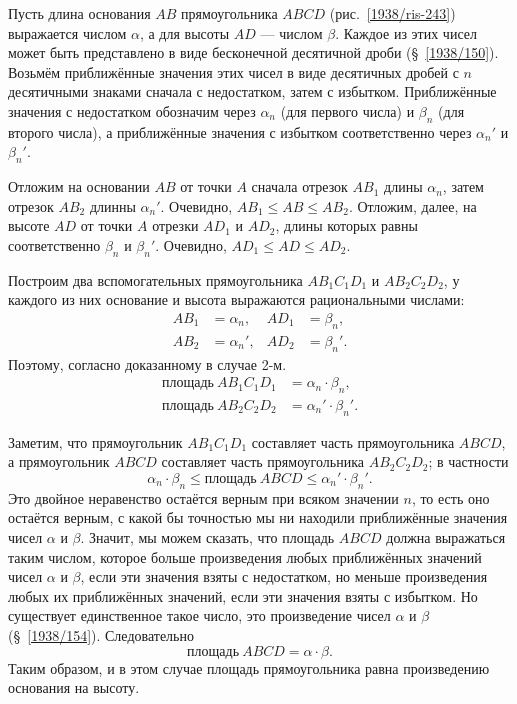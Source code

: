 \documentclass[twoside]{book}
\begin{document}
Пусть длина основания $AB$ прямоугольника $ABCD$ (рис.~\ref{1938/ris-243}) выражается  числом $\alpha$, а для высоты $AD$ — числом $\beta$.
Каждое из этих чисел может быть представлено в виде бесконечной десятичной дроби (§~\ref{1938/150}).
Возьмём приближённые значения этих чисел в виде десятичных дробей с $n$ десятичными знаками сначала с недостатком, затем с избытком.
Приближённые значения с недостатком обозначим через $\alpha_n$ (для первого числа) и $\beta_n$ (для второго числа), а приближённые значения с избытком соответственно через  $\alpha_n'$ и $\beta_n'$.

Отложим на основании $AB$ от точки $A$ сначала отрезок $AB_1$ длины $\alpha_n$, затем отрезок $AB_2$ длинны  $\alpha_n'$.
Очевидно, $AB_1\le AB\le AB_2$.
Отложим, далее, на высоте $AD$ от точки $A$ отрезки $AD_1$ и $AD_2$, длины которых равны соответственно $\beta_n$ и $\beta_n'$.
Очевидно, $AD_1\le AD\le AD_2$.

{\sloppy

Построим два вспомогательных прямоугольника $AB_1C_1D_1$ и $AB_2C_2D_2$, у каждого из них основание и высота выражаются рациональными числами:
\begin{align*}
AB_1&=\alpha_n,
&
AD_1&=\beta_n,
\\
AB_2&=\alpha_n',
&
AD_2&=\beta_n'.
\end{align*}
Поэтому, согласно доказанному в случае 2-м.
\begin{align*}
\text{площадь}~AB_1C_1D_1 &= \alpha_n\cdot \beta_n, 
\\
\text{площадь}~AB_2C_2D_2 &= \alpha_n'\cdot \beta_n'. 
\end{align*}

}

Заметим, что прямоугольник $AB_1C_1D_1$ составляет часть прямоугольника $ABCD$, 
а прямоугольник $ABCD$ составляет часть прямоугольника $AB_2C_2D_2$;
в частности
\[\alpha_n\cdot \beta_n\le\text{площадь}~ABCD\le\alpha_n'\cdot \beta_n'.\]
Это двойное неравенство остаётся верным при всяком значении $n$, то есть оно остаётся верным, с какой бы точностью мы ни находили приближённые значения чисел $\alpha$ и $\beta$.
Значит, мы можем сказать, что площадь $ABCD$ должна выражаться таким числом, которое больше произведения любых приближённых значений чисел $\alpha$ и $\beta$, если эти значения взяты с недостатком, но меньше произведения любых их приближённых значений, если эти значения взяты с избытком.
Но существует единственное такое число, это произведение чисел $\alpha$ и $\beta$ (§~\ref{1938/154}).
Следовательно 
\[\text{площадь}~ABCD=\alpha\cdot \beta.\]
Таким образом, и в этом случае площадь прямоугольника равна произведению основания на высоту.
\end{document}
